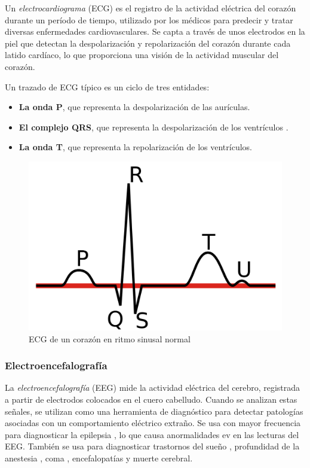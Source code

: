 Un \textit{electrocardiograma} \cite{subramanian2017ecg} (ECG) es el registro de la actividad eléctrica del corazón durante un período de tiempo, utilizado por los médicos para predecir y tratar diversas enfermedades cardiovasculares. Se capta a través de unos electrodos en la piel que detectan la despolarización y repolarización del corazón durante cada latido cardíaco, lo que proporciona una visión de la actividad muscular del corazón. \newline

Un trazado de ECG típico es un ciclo de tres entidades:

\begin{itemize}
	\item \textbf{La onda P}, que representa la despolarización de las aurículas.
	\item \textbf{El complejo QRS}, que representa la despolarización de los ventrículos .
 	\item \textbf{La onda T}, que representa la repolarización de los ventrículos.
\end{itemize}

\begin{figure}[H]
	\center
	\includegraphics[scale=0.1]{imagenes/EstadodelArte/ECG.png}
	\caption{ECG de un corazón en ritmo sinusal normal}
	\label{fig:ECG}
\end{figure}
 

\subsubsection{Electroencefalografía}

La \textit{electroencefalografía} (EEG) mide la actividad eléctrica del cerebro, registrada a partir de electrodos colocados en el cuero cabelludo. Cuando se analizan estas señales, se utilizan como una herramienta de diagnóstico para detectar patologías asociadas con un comportamiento eléctrico extraño.  Se usa con mayor frecuencia para diagnosticar la epilepsia , lo que causa anormalidades ev en las lecturas del EEG. También se usa para diagnosticar trastornos del sueño , profundidad de la anestesia , coma , encefalopatías y muerte cerebral.

